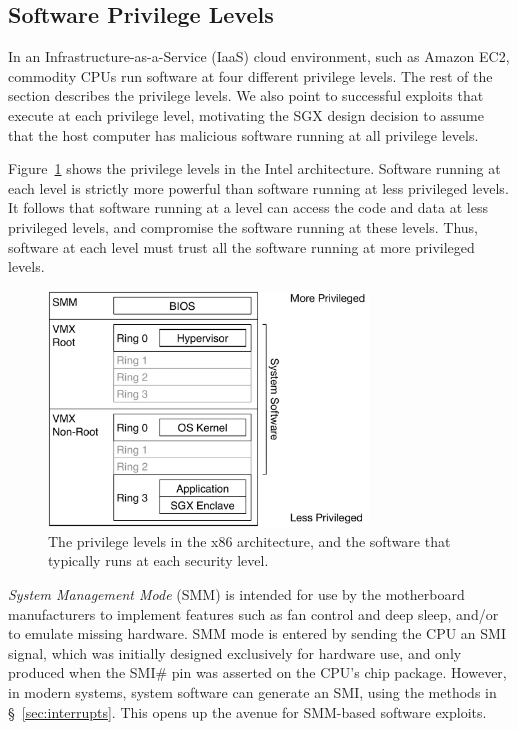 \subsection{Software Privilege Levels}
\label{sec:rings}

In an Infrastructure-as-a-Service (IaaS) cloud environment, such as Amazon EC2,
commodity CPUs run software at four different privilege levels. The rest of the
section describes the privilege levels. We also point to successful exploits
that execute at each privilege level, motivating the SGX design decision to
assume that the host computer has malicious software running at all privilege
levels.

Figure~\ref{fig:cpu_rings} shows the privilege levels in the Intel
architecture. Software running at each level is strictly more powerful than
software running at less privileged levels. It follows that software running at
a level can access the code and data at less privileged levels, and compromise
the software running at these levels. Thus, software at each level must trust
all the software running at more privileged levels.

\begin{figure}[hbtp]
  \centering
  \includegraphics[width=85mm]{figures/cpu_rings.pdf}
  \caption{
    The privilege levels in the x86 architecture, and the software that
    typically runs at each security level.
  }
  \label{fig:cpu_rings}
\end{figure}


\textit{System Management Mode} (SMM) is intended for use by the motherboard
manufacturers to implement features such as fan control and deep sleep, and/or
to emulate missing hardware. SMM mode is entered by sending the CPU an SMI
signal, which was initially designed exclusively for hardware use, and only
produced when the SMI\# pin was asserted on the CPU's chip package. However, in
modern systems, system software can generate an SMI, using the methods in
\S~\ref{sec:interrupts}. This opens up the avenue for SMM-based software
exploits.

